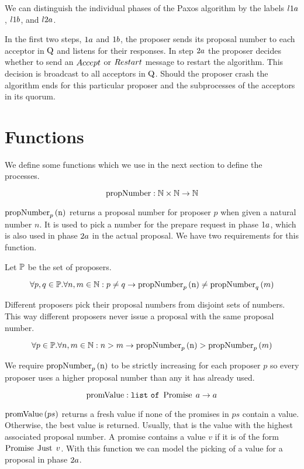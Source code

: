 We can distinguish the individual phases of the Paxos algorithm by the labels $l1a$, $l1b$, and $l2a$.

In the first two steps, $1a$ and $1b$, the proposer sends its proposal number to each acceptor in $\operatorname{Q}$ and listens for their responses.
In step $2a$ the proposer decides whether to send an $\mathnormal{Accept}$ or $\mathnormal{Restart}$ message to restart the algorithm.
This decision is broadcast to all acceptors in $\operatorname{Q}$.
Should the proposer crash the algorithm ends for this particular proposer and the subprocesses of the acceptors in its quorum.

\section{Functions}
We define some functions which we use in the next section to define the processes.

\[\operatorname{propNumber} : \mathbb{N} \times \mathbb{N} \to \mathbb{N}\]

$\operatorname{propNumber}_p\left( \operatorname{n}\right)$ returns a proposal number for proposer $p$ when given a natural number $n$.
It is used to pick a number for the prepare request in phase $1a$, which is also used in phase $2a$ in the actual proposal.
We have two requirements for this function.

Let $\mathbb{P}$ be the set of proposers.

\[\forall p,q \in \mathbb{P} . \forall n,m \in \mathbb{N}: p \neq q \to \operatorname{propNumber}_p\left( \operatorname{n}\right) \neq \operatorname{propNumber}_q\left( m\right)\]

Different proposers pick their proposal numbers from disjoint sets of numbers.
This way different proposers never issue a proposal with the same proposal number.

\[\forall p \in \mathbb{P} . \forall n,m \in \mathbb{N}: n > m \to \operatorname{propNumber}_p\left( \operatorname{n}\right) > \operatorname{propNumber}_p\left( m\right)\]

We require $\operatorname{propNumber}_p\left( \operatorname{n}\right)$ to be strictly increasing for each proposer $p$ so every proposer uses a higher proposal number than any it has already used.

\[\operatorname{promValue} : \mathtt{list\ of\ } \operatorname{Promise}\; a \to a\]

$\operatorname{promValue}\left(ps\right)$ returns a fresh value if none of the promises in $ps$ contain a value.
Otherwise, the best value is returned. Usually, that is the value with the highest associated proposal number.
A promise contains a value $v$ if it is of the form $\operatorname{Promise}\; \operatorname{Just}\; v$.
With this function we can model the picking of a value for a proposal in phase $2a$.

